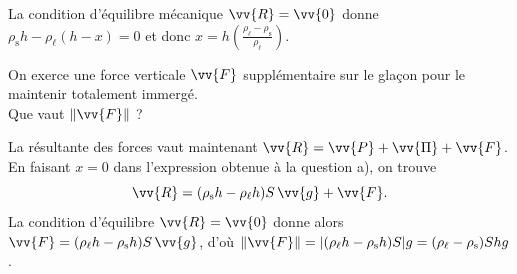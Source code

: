 
\begin{corrige}
La condition d'équilibre mécanique $\vv{R}=\vv{0}$ donne $\rho_\text{s}h-\rho_\ell (h-x)=0$ et donc 
$x=h\left(\frac{\rho_\ell-\rho_\text{s}}{\rho_\ell}\right)$.
\end{corrige}

\begin{enonce}
On exerce une force verticale $\vv{F}$ supplémentaire sur le glaçon pour le maintenir totalement immergé.\\ Que vaut $\|\vv{F}\|$ ? 
\end{enonce}


\begin{corrige}
La résultante des forces vaut maintenant $\vv{R}=\vv{P}+\vv{\Pi}+\vv{F}$. En faisant $x=0$ dans l'expression obtenue à la question a), on trouve
\[
\vv{R}=(\rho_\text{s}h-\rho_\ell h)S\,\vv{g}+\vv{F}.
\]
La condition d'équilibre $\vv{R}=\vv{0}$ donne alors $\vv{F}=(\rho_\ell h-\rho_\text{s}h)S\,\vv{g}$, d'où
$\|\vv{F}\|=|(\rho_\ell h-\rho_\text{s}h)S|g=(\rho_\ell-\rho_\text{s})Shg$.
\end{corrige}



\finEntrainement





\newpage



\hauteurLargeurCadreReponse		{7mm}{3cm}
\typeEntrainement				{} %
\initialisationEntrainement

